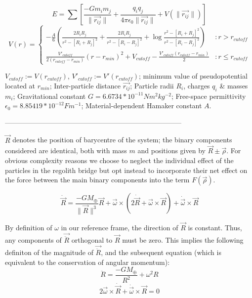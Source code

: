 \documentclass[letterpaper, preprint, paper,11pt]{AAS}
\begin{document}
\begin{equation}
E = \sum\left[\frac{-Gm_im_j}{\|\vec{r_{ij}}\|}+\frac{q_iq_j}{4\pi\epsilon_0\|\vec{r_{ij}}\|}+V(\|\vec{r_{ij}}\|)\right]
\end{equation}
\begin{equation}
V(r) = \left\{
\begin{array}{lr}
-\frac{A}{6}\left(\frac{2R_iR_j}{r^2-[R_i+R_j]^2}+\frac{2R_iR_j}{r^2-[R_i-R_j]^2}+\log\frac{r^2-[R_i+R_j]^2}{r^2-[R_i-R_j]^2}\right) & : r > r_{cutoff}\\
\frac{V'_{cutoff}}{2(r_{cutoff}-r_{min})}(r-r_{min})^2+V_{cutoff} - \frac{V'_{cutoff}(r_{cutoff}-r_{min})}{2} & : r \leq r_{cutoff}
\end{array}
\right.
\end{equation}

$V_{cutoff} := V(r_{cutoff})$,  $V'_{cutoff} := V'(r_{cutoff})$; minimum value of pseudopotential located at $r_{min}$; Inter-particle distance $\vec{r_{ij}}$; Particle radii $R_i$, charges $q_i$ \& masses $m_i$; Gravitational constant $G = 6.6734*10^{-11} Nm^2kg^{-2} $; Free-space permittivity $\epsilon_0 = 8.85419*10^{-12} Fm^{-1}$; Material-dependent Hamaker constant $A$. 

-----------------------------------------------------------------------------

$\vec{R}$ denotes the position of barycentre of the system; the binary components considered are identical, both with mass $m$ and positions given by $\vec{R}\pm\vec{\rho}$. For obvious complexity reasons we choose to neglect the individual effect of the particles in the regolith bridge but opt instead to incorporate their net effect on the force between the main binary components into the term $F(\vec{\rho})$. 

\begin{equation}
\ddot{\vec{R}} = \frac{-GM_\oplus}{\|\vec{R}\|^{3}}\vec{R}+\vec{\omega}\times(2\dot{\vec{R}}+\vec{\omega}\times\vec{R})+\dot{\vec{\omega}}\times\vec{R}
\end{equation}

By definition of $\omega$ in our reference frame, the direction of $\vec{R}$ is constant. Thus, any components of $\vec{\ddot{R}}$ orthogonal to $\vec{R}$ must be zero. This implies the following definiton of the magnitude of $\vec{\ddot{R}}$, and the subsequent equation (which is equivalent to the conservation of angular momentum): 
\begin{equation}
\ddot{R} = \frac{-GM_\oplus}{R^{2}}+\omega^{2}R
\end{equation}
\begin{equation}
2\vec{\omega}\times\dot{\vec{R}}+\dot{\vec{\omega}}\times\vec{R}=0
\end{equation}
\end{document}
